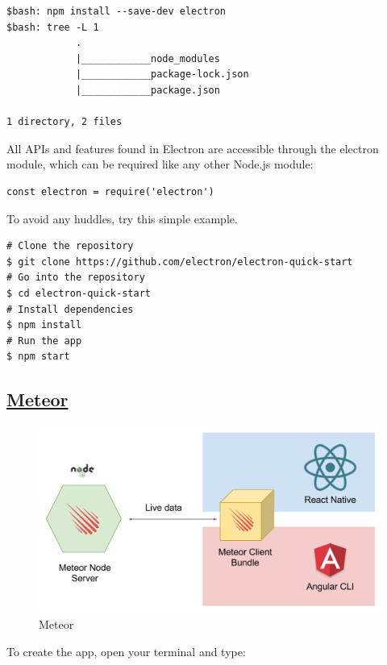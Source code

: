 \documentclass[10pt, a4paper, twocolumn]{article}
\begin{document}
\begin{lstlisting}
$bash: npm install --save-dev electron
$bash: tree -L 1
			.
			|____________node_modules
			|____________package-lock.json
			|____________package.json

1 directory, 2 files
\end{lstlisting}

All APIs and features found in Electron are accessible through the electron module, which can be required like any other Node.js module:

\begin{lstlisting}
const electron = require('electron')
\end{lstlisting}

To avoid any huddles, try this simple example.

\begin{lstlisting}
# Clone the repository
$ git clone https://github.com/electron/electron-quick-start
# Go into the repository
$ cd electron-quick-start
# Install dependencies
$ npm install
# Run the app
$ npm start
\end{lstlisting}

\subsection{\href{https://www.meteor.com/install}{Meteor}}


\begin{figure}[h!]
	\includegraphics[width=\linewidth]{meteor.png} %
	\caption{Meteor} %
	\label{mtr} %
\end{figure}

To create the app, open your terminal and type:
\end{document}
